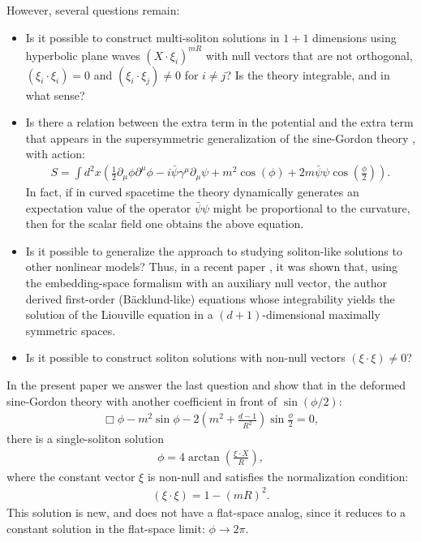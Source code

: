 \documentclass{article}
\begin{document}
However, several questions remain:
\begin{itemize}
    \item Is it possible to construct multi-soliton solutions in $1+1$ dimensions using hyperbolic plane waves $ (X \cdot \xi_i )^{m R}$ with null vectors that are not orthogonal, $(\xi_i \cdot \xi_i)=0$ and $(\xi_i \cdot \xi_j) \ne 0$ for $i \neq j$? Is the theory integrable, and in what sense?
    \item Is there a relation between the extra term in the potential and the extra term that appears in the supersymmetric generalization of the sine-Gordon theory \cite{Inami:1995np}, with action:
\begin{align}
    S=\int d^2 x \left(\frac{1}{2}\partial_\mu \phi \partial^\mu \phi-i\bar{\psi} \gamma^\mu \partial_\mu \psi +m^2 \cos \left(\phi\right) +2 m \bar{\psi} \psi \cos\left( \frac{\phi}{2}\right) \right).
\end{align}
In fact, if in curved spacetime the theory dynamically generates an expectation value of the operator $\bar{\psi} \psi$ might be proportional to the curvature, then for the scalar field one obtains the above equation.
\item Is it possible to generalize the approach to studying soliton-like solutions to other nonlinear models? Thus, in a recent paper \cite{Sadekov:2026gmc}, it was shown that, using the embedding-space formalism with an auxiliary null vector, the author derived first-order (Bäcklund-like) equations whose integrability yields the solution of the Liouville equation in a $(d+1)$-dimensional maximally symmetric spaces.
\item Is it possible to construct soliton solutions with non-null vectors $(\xi \cdot \xi)\ne0$?
\end{itemize}

In the present paper we answer the last question and show that in the deformed sine-Gordon theory with another coefficient in front of $\sin(\phi/2)$:
\begin{align}
    \Box \phi - m^2 \sin \phi - 2 \left(m^2+\frac{d-1}{R^2}\right) \sin \frac{\phi}{2} = 0,
\end{align}
there is a single-soliton solution
\begin{align}
     \phi = 4 \arctan \left( \frac{\xi \cdot X }{R}\right),
\end{align}
where the constant vector $\xi$ is non-null and satisfies the normalization condition:
\begin{align}
    (\xi \cdot \xi) = 1 - (m R)^2.
\end{align}
This solution is new, and does not have a flat-space analog, since it reduces to a constant solution in the flat-space limit: $\phi \to 2\pi$.
\end{document}
